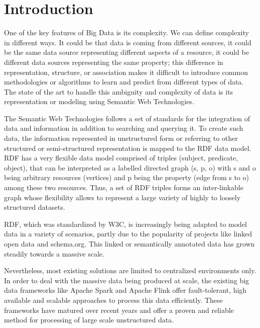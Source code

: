 \chapter{Introduction}
\label{chapter:intro}
One of the key features of Big Data is its complexity. 
We can define complexity in different ways.
It could be that data is coming from different sources, it could be the same data source representing different aspects of a resource, it could be different data sources representing the same property; this difference in representation, structure, or association makes it difficult to introduce common methodologies or algorithms to learn and predict from different types of data. 
The state of the art to handle this ambiguity and complexity of data is its representation or modeling using Semantic Web Technologies.

The Semantic Web Technologies follows a set of standards for the integration of data and information in addition to searching and querying it. 
To create such data, the information represented in unstructured form or referring to other structured or semi-structured representation is mapped to the \gls{RDF} data model. 
\gls{RDF} has a very flexible data model comprised of triples (subject, predicate, object), that can be interpreted as a labelled directed graph (s, p, o) with s and o being arbitrary resources (vertices) and p being the property (edge from s to o) among these two resources. 
Thus, a set of \gls{RDF} triples forms an inter-linkable graph whose flexibility allows to represent a large variety of highly to loosely structured datasets. 

\gls{RDF}, which was standardized by \gls{W3C}, is increasingly being adapted to model data in a variety of scenarios, partly due to the popularity of projects like linked open data and schema.org. 
This linked or semantically annotated data has grown steadily towards a massive scale.

Nevertheless, most existing solutions are limited to centralized environments only.
In order to deal with the massive data being produced at scale, the existing big data frameworks like Apache Spark and Apache Flink offer fault-tolerant, high available and scalable approaches to process this data efficiently. 
These frameworks have matured over recent years and offer a proven and reliable method for processing of large scale unstructured data.

